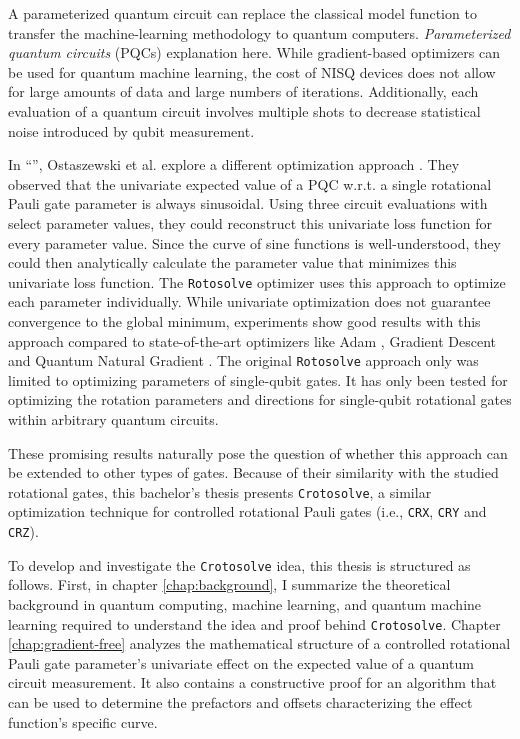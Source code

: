 A parameterized quantum circuit can replace the classical model function to
transfer the machine-learning methodology to quantum computers.
\emph{Parameterized quantum circuits} (PQCs) explanation here. %
While gradient-based optimizers can be used for quantum machine learning,
the cost of NISQ devices does not allow for large amounts of data and large
numbers of iterations.
Additionally, each evaluation of a quantum circuit involves multiple shots to
decrease statistical noise introduced by qubit measurement.

In ``\emph{}'', Ostaszewski et al.
explore a different optimization approach \cite{ostaszewski_structure_2021}.
They observed that the univariate expected value of a PQC w.r.t. a single
rotational Pauli gate parameter is always sinusoidal.
Using three circuit evaluations with select parameter values, they could
reconstruct this univariate loss function for every parameter value.
Since the curve of sine functions is well-understood, they could then
analytically calculate the parameter value that minimizes this univariate loss
function.
The \texttt{Rotosolve} optimizer uses this approach to optimize each parameter
individually.
While univariate optimization does not guarantee convergence to the global
minimum, experiments show good results with this approach compared to
state-of-the-art optimizers like Adam \cite{kingma_adam_2017},
Gradient Descent and Quantum Natural Gradient \cite{stokes_quantum_2020}.
The original \texttt{Rotosolve} approach only was limited to optimizing
parameters of single-qubit gates.
It has only been tested for optimizing the rotation parameters and directions
for single-qubit rotational gates within arbitrary quantum circuits.

These promising results naturally pose the question of whether this approach can
be extended to other types of gates.
Because of their similarity with the studied rotational gates, this bachelor's
thesis presents \texttt{Crotosolve}, a similar optimization technique for
controlled rotational Pauli gates (i.e., \texttt{CRX}, \texttt{CRY} and
\texttt{CRZ}).

To develop and investigate the \texttt{Crotosolve} idea, this thesis is
structured as follows.
First, in chapter \ref{chap:background}, I summarize the theoretical background
in quantum computing, machine learning, and quantum machine learning required to
understand the idea and proof behind \texttt{Crotosolve}.
Chapter \ref{chap:gradient-free} analyzes the mathematical structure of a
controlled rotational Pauli gate parameter's univariate effect on the
expected value of a quantum circuit measurement.
It also contains a constructive proof for an algorithm that can be used to
determine the prefactors and offsets characterizing the effect function's
specific curve.

